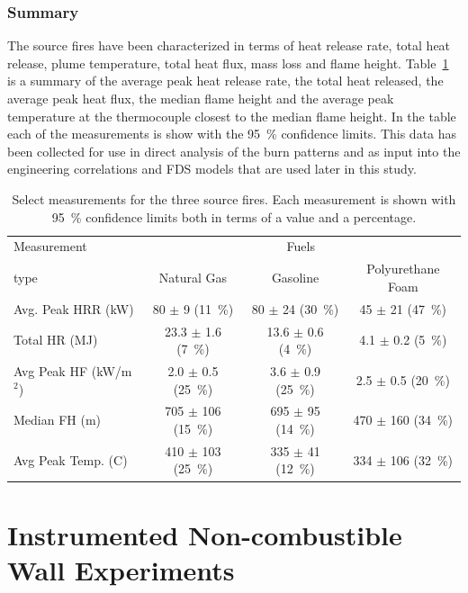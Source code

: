 \documentclass[twoside]{uocthesis}
\begin{document}
{\subsection{Summary}

The source fires have been characterized in terms of heat release rate, total heat release, plume temperature, total heat flux, mass loss and flame height.  Table~\ref{tab:Source_fire_summary} is a summary of the average peak heat release rate, the total heat released, the average peak heat flux, the median flame height and the average peak temperature at the thermocouple closest to the median flame height. In the table each of the measurements is show with the 95~\% confidence limits.  This data has been collected for use in direct analysis of the burn patterns and as input into the engineering correlations and FDS models that are used later in this study.

\begin{table}
\small
\centering
\begin{tabular}{|l|c|c|c|}
\hline
Measurement     &   \multicolumn{3}{|c|}{Fuels} \\ \cline{2-4}
type                    &       Natural Gas	            &   Gasoline	            & Polyurethane Foam \\ \hline \hline
Avg. Peak HRR (kW)      &       80 $\pm$ 9 (11~\%)   &	80 $\pm$ 24 (30~\%) 	& 45 $\pm$ 21 (47~\%)   \\
Total HR (MJ)           &   	23.3 $\pm$ 1.6 (7~\%)   &	13.6 $\pm$ 0.6 (4~\%) 	& 4.1 $\pm$ 0.2 (5~\%)   \\
Avg Peak HF (kW/m$^2$)   &   	2.0 $\pm$ 0.5 (25~\%)   &	3.6 $\pm$ 0.9 (25~\%) 	& 2.5 $\pm$ 0.5 (20~\%)   \\
Median FH (m)           &   	705 $\pm$ 106 (15~\%)   &	695 $\pm$ 95 (14~\%) 	& 470 $\pm$ 160 (34~\%)   \\
Avg Peak Temp. (C)      &   	410 $\pm$ 103 (25~\%)   &	335 $\pm$ 41 (12~\%) 	& 334 $\pm$ 106 (32~\%)   \\
\hline
\end{tabular}
 \caption[Select measurements for the three source fires]{Select measurements for the three source fires. Each measurement is shown with 95~\% confidence limits both in terms of a value and a percentage.}
 \label{tab:Source_fire_summary}
\end{table}



\chapter{Instrumented Non-combustible Wall Experiments}

}
\end{document}
